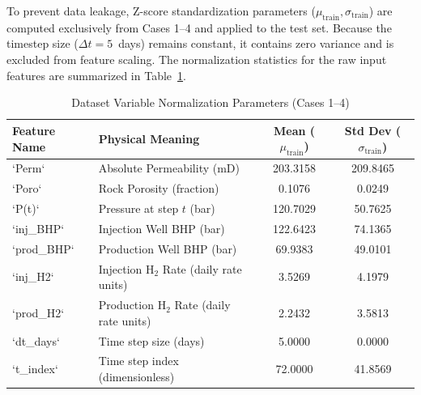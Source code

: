 To prevent data leakage, Z-score standardization parameters ($\mu_{\text{train}}, \sigma_{\text{train}}$) are computed exclusively from Cases 1--4 and applied to the test set. Because the timestep size ($\Delta t = 5$~days) remains constant, it contains zero variance and is excluded from feature scaling. The normalization statistics for the raw input features are summarized in Table~\ref{tab:dataset_stats}.

\begin{table}[t]
\centering
\caption{Dataset Variable Normalization Parameters (Cases 1--4)}
\label{tab:dataset_stats}
\begin{tabularx}{\linewidth}{lXcc}
\toprule
\textbf{Feature Name} & \textbf{Physical Meaning} & \textbf{Mean ($\mu_{\text{train}}$)} & \textbf{Std Dev ($\sigma_{\text{train}}$)} \\
\midrule
`Perm` & Absolute Permeability (mD) & 203.3158 & 209.8465 \\
`Poro` & Rock Porosity (fraction) & 0.1076 & 0.0249 \\
`P(t)` & Pressure at step $t$ (bar) & 120.7029 & 50.7625 \\
`inj\_BHP` & Injection Well BHP (bar) & 122.6423 & 74.1365 \\
`prod\_BHP` & Production Well BHP (bar) & 69.9383 & 49.0101 \\
`inj\_H2` & Injection H$_2$ Rate (daily rate units) & 3.5269 & 4.1979 \\
`prod\_H2` & Production H$_2$ Rate (daily rate units) & 2.2432 & 3.5813 \\
`dt\_days` & Time step size (days) & 5.0000 & 0.0000 \\
`t\_index` & Time step index (dimensionless) & 72.0000 & 41.8569 \\
\bottomrule
\end{tabularx}
\end{table}

